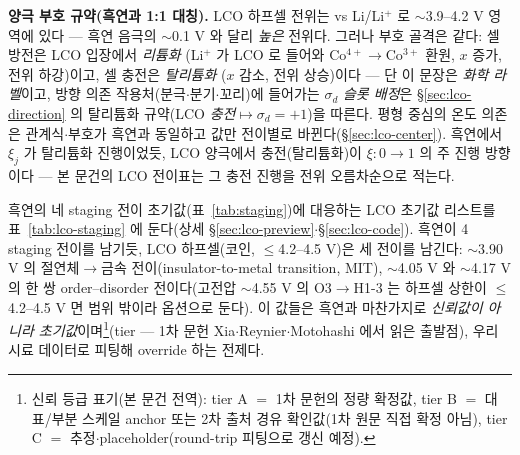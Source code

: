 \textbf{양극 부호 규약(흑연과 1:1 대칭).} LCO 하프셀 전위는 vs Li/Li$^+$ 로 $\sim$3.9--4.2 V 영역에 있다 --- 흑연 음극의
$\sim$0.1 V 와 달리 \emph{높은} 전위다. 그러나 부호 골격은 같다: 셀 방전은 LCO 입장에서 \emph{리튬화}
(Li$^+$ 가 LCO 로 들어와 Co$^{4+}\!\to$Co$^{3+}$ 환원, $x$ 증가, 전위 하강)이고, 셀 충전은 \emph{탈리튬화}
($x$ 감소, 전위 상승)이다 --- 단 이 문장은 \emph{화학 라벨}이고, 방향 의존 작용처(분극$\cdot$분기$\cdot$꼬리)에 들어가는
$\sigma_d$ \emph{슬롯 배정}은 \S\ref{sec:lco-direction} 의 탈리튬화 규약(LCO \emph{충전}$\mapsto\sigma_d{=}+1$)을
따른다. 평형 중심의 온도 의존은 관계식$\cdot$부호가 흑연과 동일하고 값만 전이별로 바뀐다(\S\ref{sec:lco-center}).
흑연에서 $\xi_j$ 가 탈리튬화 진행이었듯, LCO 양극에서 충전(탈리튬화)이 $\xi:0\!\to\!1$ 의 주 진행 방향이다 --- 본 문건의
LCO 전이표는 그 충전 진행을 전위 오름차순으로 적는다.

흑연의 네 staging 전이 초기값(표~\ref{tab:staging})에 대응하는 LCO 초기값 리스트를 표~\ref{tab:lco-staging}
에 둔다(상세 \S\ref{sec:lco-preview}$\cdot$\S\ref{sec:lco-code}). 흑연이 4 staging 전이를 남기듯, LCO
하프셀(코인, $\le$4.2--4.5 V)은 세 전이를 남긴다\cite{xia2007}: $\sim$3.90 V 의 절연체$\to$금속 전이(insulator-to-metal transition, MIT), $\sim$4.05 V 와
$\sim$4.17 V 의 한 쌍 order--disorder 전이다(고전압 $\sim$4.55 V 의 O3$\to$H1-3 는 하프셀 상한이 $\le$4.2--4.5 V 면
범위 밖이라 옵션으로 둔다). 이 값들은 흑연과 마찬가지로 \emph{신뢰값이 아니라 초기값}이며\footnote{신뢰
등급 표기(본 문건 전역): tier A $=$ 1차 문헌의 정량 확정값, tier B $=$ 대표/부분 스케일 anchor 또는
2차 출처 경유 확인값(1차 원문 직접 확정 아님), tier C $=$ 추정$\cdot$placeholder(round-trip 피팅으로
갱신 예정).}(tier --- 1차 문헌
Xia\cite{xia2007}$\cdot$Reynier\cite{reynier2004}$\cdot$Motohashi\cite{motohashi2009} 에서 읽은 출발점), 우리 시료 데이터로
피팅해 override 하는 전제다.

